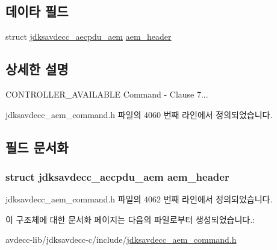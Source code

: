 \subsection*{데이타 필드}
\begin{DoxyCompactItemize}
\item 
struct \hyperlink{structjdksavdecc__aecpdu__aem}{jdksavdecc\+\_\+aecpdu\+\_\+aem} \hyperlink{structjdksavdecc__aem__command__controller__available_ae1e77ccb75ff5021ad923221eab38294}{aem\+\_\+header}
\end{DoxyCompactItemize}


\subsection{상세한 설명}
C\+O\+N\+T\+R\+O\+L\+L\+E\+R\+\_\+\+A\+V\+A\+I\+L\+A\+B\+LE Command -\/ Clause 7... 

jdksavdecc\+\_\+aem\+\_\+command.\+h 파일의 4060 번째 라인에서 정의되었습니다.



\subsection{필드 문서화}
\subsubsection[{\texorpdfstring{aem\+\_\+header}{aem_header}}]{\setlength{\rightskip}{0pt plus 5cm}struct {\bf jdksavdecc\+\_\+aecpdu\+\_\+aem} aem\+\_\+header}\hypertarget{structjdksavdecc__aem__command__controller__available_ae1e77ccb75ff5021ad923221eab38294}{}\label{structjdksavdecc__aem__command__controller__available_ae1e77ccb75ff5021ad923221eab38294}


jdksavdecc\+\_\+aem\+\_\+command.\+h 파일의 4062 번째 라인에서 정의되었습니다.



이 구조체에 대한 문서화 페이지는 다음의 파일로부터 생성되었습니다.\+:\begin{DoxyCompactItemize}
\item 
avdecc-\/lib/jdksavdecc-\/c/include/\hyperlink{jdksavdecc__aem__command_8h}{jdksavdecc\+\_\+aem\+\_\+command.\+h}\end{DoxyCompactItemize}
